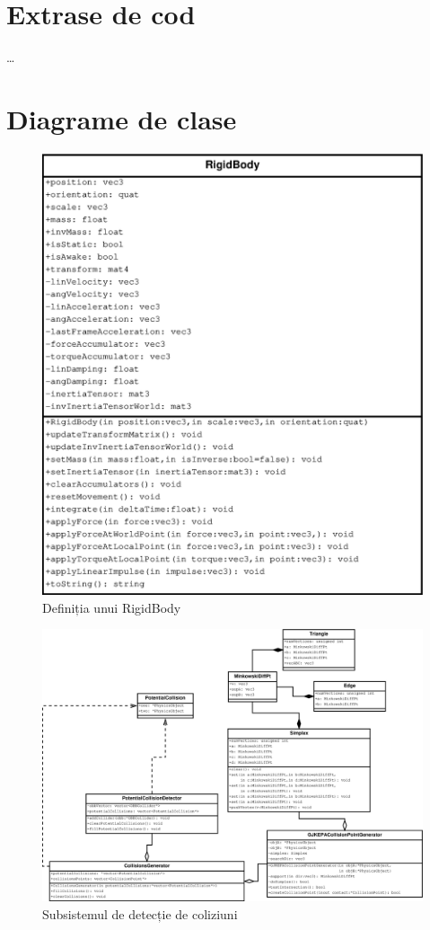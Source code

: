 \documentclass[12pt,a4paper]{report}
\begin{document}
\begin{appendices}

\chapter{Extrase de cod} %
\ldots
\chapter{Diagrame de clase}
\begin{figure}[H]
	\centering
	\includegraphics[width=0.7\linewidth]{pics/RigidBody.eps}
	\caption[asdfas]{Definiția unui RigidBody}
	\label{fig:RigidBody}
\end{figure}

\begin{figure}[H]
	\centering
	\includegraphics[width=1.0\linewidth]{pics/CollisionDetection.eps}
	\caption[]{Subsistemul de detecție de coliziuni}
	\label{fig:CollisionDetection}
\end{figure}
\end{appendices}
\end{document}
